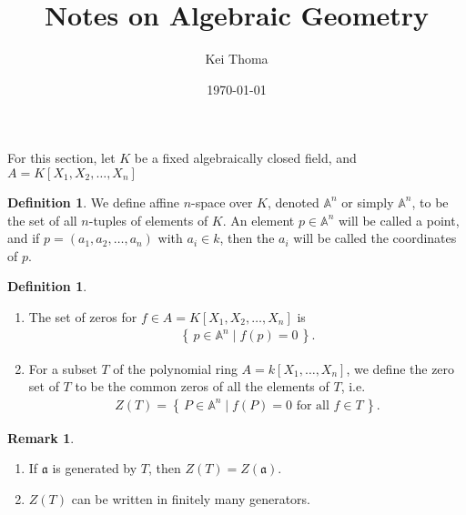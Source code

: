 \documentclass[11pt]{book}
\title{Notes on Algebraic Geometry}
\author{Kei Thoma}
\date{\today}
\theoremstyle{definition}
\newtheorem{definition}[theorem]{Definition}
\newtheorem{remark}[theorem]{Remark}
\numberwithin{equation}{section}
\newcommand{\makeset}[2]{\left\{\, #1 \mathrel{\mid} #2 \,\right\}}
\begin{document}
\maketitle
\tableofcontents

\cite{hartshorne1977}
\newpage
For this section, let \(K\) be a fixed algebraically closed field, and \(A = K[X_1, X_2, \ldots, X_n]\)
\begin{defbox}
    \begin{definition}
        We define affine \( n \)-space over \( K \), denoted \( \mathbb{A}^n \) or simply \( \mathbb{A}^n \), to be the set of all \( n \)-tuples of elements of \( K \). An element \( p \in \mathbb{A}^n \) will be called a point, and if \( p = (a_1, a_2, \ldots, a_n) \) with \( a_i \in k \), then the \( a_i \) will be called the coordinates of \( p \).
    \end{definition}
\end{defbox}

\begin{defbox}
    \begin{definition}
        \begin{enumerate}
            \item The set of zeros for \(f \in A = K[X_1, X_2, \ldots, X_n]\) is
            \begin{align*}
                \makeset{p \in \mathbb{A}^n}{f(p) = 0}\text{.}
            \end{align*}
        
            \item For a subset \(T\) of the polynomial ring \(A = k[X_1, \ldots, X_n]\), we define the zero set of \(T\) to be the common zeros of all the elements of \(T\), i.e.
            \begin{align*}
                Z(T) = \makeset{P \in \mathbb{A}^n}{f(P) = 0 \text{ for all } f \in T} \text{.}
            \end{align*}
        \end{enumerate}
    \end{definition}
\end{defbox}

\begin{rembox}
\begin{remark}
    \begin{enumerate}
        \item If \(\mathfrak{a}\) is generated by \(T\), then \(Z(T) = Z(\mathfrak{a})\).
        \item \(Z(T)\) can be written in finitely many generators.
    \end{enumerate}
\end{remark}
\end{rembox}
\end{document}
